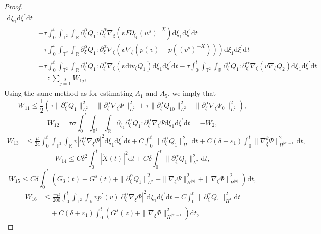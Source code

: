 \documentclass[10pt,a4paper]{amsart}
\newcommand{\ddiv}{\mathrm{div}}
\newcommand{\dif}{\mathrm{d}}
\begin{document}
\begin{proof}
\begin{align*}
    \dif \xi_1\dif \xi^{\prime}\dif t\\
&+\tau\int_0^t\int_{\mathbb{T}^2}\int_{\mathbb{R}}
      \partial_\xi^\alpha Q_1: \partial_\xi^\alpha\nabla_\xi(vF\partial_{\xi_1}(u^s)^{-X})
        \dif \xi_1\dif \xi^{\prime}\dif t\\
&-\tau\int_0^t\int_{\mathbb{T}^2}\int_{\mathbb{R}}
 \partial_\xi^\alpha Q_1: \partial_\xi^\alpha\nabla_\xi(v\nabla_\xi\left(p(v)-p((v^s)^{-X})\right))
    \dif \xi_1\dif \xi^{\prime}\dif t\\
    &+\tau\int_0^t\int_{\mathbb{T}^2}\int_{\mathbb{R}}
      \partial_\xi^\alpha Q_1: \partial_\xi^\alpha\nabla_\xi(v\ddiv_\xi Q_1)
        \dif \xi_1\dif \xi^{\prime}\dif t
-\tau\int_0^t\int_{\mathbb{T}^2}\int_{\mathbb{R}}
  \partial_\xi^\alpha Q_1: \partial_\xi^\alpha\nabla_\xi(v\nabla_\xi Q_2)
    \dif \xi_1\dif \xi^{\prime}\dif t\\
    &=:\sum\limits_{j=1}\limits^8W_{1j},
\end{align*}
Using the same method as for estimating $A_1$ and $A_5$, we imply that
\[
W_{11}\le \frac{1}{2}\left(\tau\|\partial_\xi^\alpha Q_{1}\|_{L^2}^2+\|\partial_\xi^\alpha\nabla_\xi\Psi\|_{L^2}^2
+\tau\|\partial_\xi^\alpha Q_{10}\|_{L^2}^2+\|\partial_\xi^\alpha\nabla_\xi\Psi_0\|_{L^2}^2\right),
\]
\[
W_{12}=\tau\sigma\int_0^t\int_{\mathbb{T}^2}\int_{\mathbb{R}}
\partial_{\xi_1}\partial_\xi^\alpha Q_1
:\partial_\xi^\alpha\nabla_\xi\Psi\dif \xi_1\dif \xi^{\prime}\dif t=-W_2,
\]
\begin{align*}
W_{13}&\le
 \frac{\mu}{24}\int_0^t\int_{\mathbb{T}^2}\int_{\mathbb{R}}v|\partial_\xi^\alpha\nabla_\xi\Psi|^2\dif \xi_1\dif \xi^{\prime}\dif t
+C\int_0^t\|\partial_\xi^\alpha Q_1\|_{H^1}^2\dif t
+C(\delta+\varepsilon_1)\int_0^t\|\nabla^k_\xi \Psi\|_{H^{|\alpha|-1}}^2\dif t,
\end{align*}
\[
W_{14}\le C\delta^2\int_0^t|\dot X(t)|^2\dif t+C\delta\int_0^t\|\partial_\xi^\alpha Q_1\|_{L^2}^2\dif t,
\]
\[
W_{15}\le C\delta\int_0^t\left(G_3(t)+G^s(t)+\|\partial_\xi^\alpha Q_1\|_{L^2}^2
+\|\nabla_\xi\Psi\|_{H^{|\alpha|}}^2+\|\nabla_\xi\Phi\|_{H^{|\alpha|}}^2\right)\dif t,
\]
\begin{align*}
W_{16}&\le \frac{-\mu}{200}\int_0^t\int_{\mathbb{T}^2}\int_{\mathbb{R}}vp^\prime(v)|\partial_\xi^\alpha\nabla_\xi\Phi|^2\dif \xi_1\dif \xi^{\prime}\dif t
    +C\int_0^t\|\partial_\xi^\alpha Q_1\|_{H^1}^2\dif t\\
    &\quad+C(\delta+\varepsilon_1)\int_0^t\left(G^s(z)+\|\nabla_\xi \Phi\|_{H^{|\alpha|-1}}^2\right)\dif t,
  \end{align*}

\end{proof}
\end{document}

